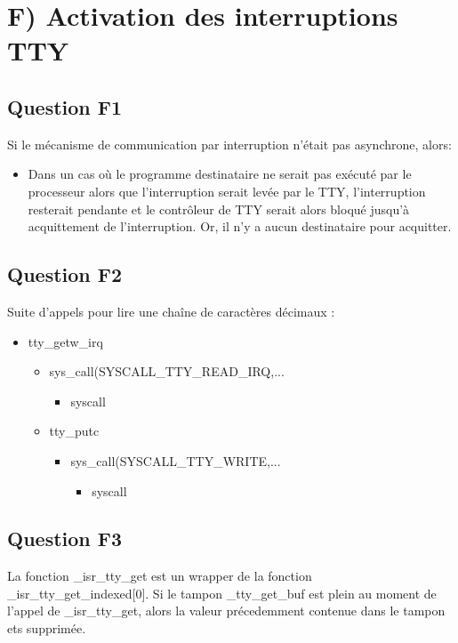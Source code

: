 \documentclass[10pt]{article}
\begin{document}
\section{F) Activation des interruptions TTY}

\subsection{Question F1}
Si le mécanisme de communication par interruption n'était pas asynchrone, alors:
\begin{itemize}
  \item Dans un cas où le programme destinataire ne serait pas exécuté par le
  processeur alors que l'interruption serait levée par le TTY, l'interruption
  resterait pendante et le contrôleur de TTY serait alors bloqué jusqu'à
  acquittement de l'interruption. Or, il n'y a aucun destinataire pour acquitter.
\end{itemize}

\subsection{Question F2}
Suite d'appels pour lire une chaîne de caractères décimaux :
\begin{itemize}
  \item tty\_getw\_irq
  \begin{itemize}
    \item sys\_call(SYSCALL\_TTY\_READ\_IRQ,...
    \begin{itemize}
      \item syscall
    \end{itemize}
    \item tty\_putc
    \begin{itemize}
      \item sys\_call(SYSCALL\_TTY\_WRITE,...
      \begin{itemize}
        \item syscall
      \end{itemize}
    \end{itemize}
  \end{itemize}
\end{itemize}

\subsection{Question F3}
La fonction \_isr\_tty\_get est un wrapper de la fonction
\_isr\_tty\_get\_indexed[0]. Si le tampon \_tty\_get\_buf est plein au moment de
l'appel de \_isr\_tty\_get, alors la valeur précedemment contenue dans le tampon
ets supprimée.
\end{document}
